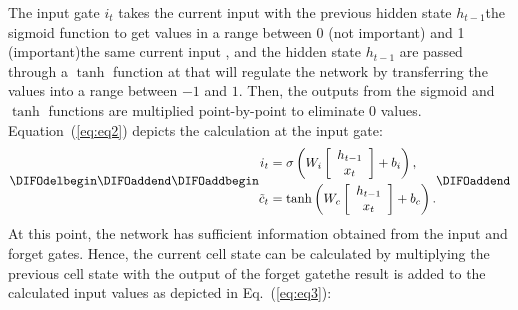 The input gate \(i_{t}\) takes the current input \DIFdelbegin {}\DIFdelend \DIFaddbegin {}\DIFaddend with the previous hidden state \(h_{t-1}\)\DIFdelbegin {}\DIFdelend \DIFaddbegin {}\DIFaddend the sigmoid function to get values in a range between 0 (not important) and 1 (important)\DIFdelbegin {}\DIFdelend \DIFaddbegin {}\DIFaddend the same current input \DIFdelbegin {}\DIFdelend \DIFaddbegin {}\DIFaddend , and the hidden state \(h_{t-1}\) are passed through a \(\tanh\) function at \DIFdelbegin {}\DIFdelend \DIFaddbegin {}\DIFaddend that will regulate the network by transferring the values into a range between \(-1\) and \(1\).
Then, the outputs from the sigmoid and \(\tanh\) functions are multiplied point-by-point to eliminate \(0\) values.  
Equation~(\ref{eq:eq2}) depicts the calculation at the input gate:
\begin{equation}
	\DIFdelbegin %
\DIFdelend \DIFaddbegin \begin{aligned}
		i_{t} &=\sigma\left(W_{i} 
		\left[
		\begin{array}{c}
			h_{t-1} \\ x_{t}
		\end{array} 
		\right]+b_{i}\right), 
		\\
		\tilde{c}_{t} &=\tanh \left(W_{c} 
		\left[
		\begin{array}{c}
			h_{t-1} \\ x_{t}
		\end{array} 
		\right]+b_{c}\right). 
	\end{aligned}\DIFaddend  \label{eq:eq2}
\end{equation}
At this point, the network has sufficient information obtained from the input and forget gates. 
Hence, the current cell state \DIFdelbegin {}\DIFdelend \DIFaddbegin {}\DIFaddend can be calculated by multiplying the previous cell state \DIFdelbegin {}\DIFdelend \DIFaddbegin {}\DIFaddend with the output of the forget gate\DIFdelbegin {}\DIFdelend \DIFaddbegin {}\DIFaddend the result is added to the calculated input values as depicted in Eq.~(\ref{eq:eq3}):
